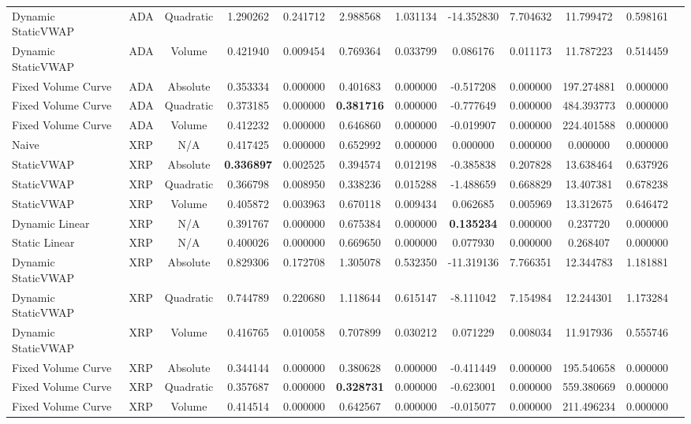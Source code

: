 \begin{table}[H]
{\begin{tabular}{llcccccccccc}
        Dynamic StaticVWAP & ADA & Quadratic & 1.290262 & 0.241712 & 2.988568 & 1.031134 & -14.352830 & 7.704632 & 11.799472 & 0.598161 \\
        Dynamic StaticVWAP & ADA & Volume & 0.421940 & 0.009454 & 0.769364 & 0.033799 & 0.086176 & 0.011173 & 11.787223 & 0.514459 \\
        Fixed Volume Curve & ADA & Absolute & 0.353334 & 0.000000 & 0.401683 & 0.000000 & -0.517208 & 0.000000 & 197.274881 & 0.000000 \\
        Fixed Volume Curve & ADA & Quadratic & 0.373185 & 0.000000 & \textbf{0.381716} & 0.000000 & -0.777649 & 0.000000 & 484.393773 & 0.000000 \\
        Fixed Volume Curve & ADA & Volume & 0.412232 & 0.000000 & 0.646860 & 0.000000 & -0.019907 & 0.000000 & 224.401588 & 0.000000 \\
        \hline
        Naive & XRP & N/A & 0.417425 & 0.000000 & 0.652992 & 0.000000 & 0.000000 & 0.000000 & 0.000000 & 0.000000 \\
        StaticVWAP & XRP & Absolute & \textbf{0.336897} & 0.002525 & 0.394574 & 0.012198 & -0.385838 & 0.207828 & 13.638464 & 0.637926 \\
        StaticVWAP & XRP & Quadratic & 0.366798 & 0.008950 & 0.338236 & 0.015288 & -1.488659 & 0.668829 & 13.407381 & 0.678238 \\
        StaticVWAP & XRP & Volume & 0.405872 & 0.003963 & 0.670118 & 0.009434 & 0.062685 & 0.005969 & 13.312675 & 0.646472 \\
        Dynamic Linear & XRP & N/A & 0.391767 & 0.000000 & 0.675384 & 0.000000 & \textbf{0.135234} & 0.000000 & 0.237720 & 0.000000 \\
        Static Linear & XRP & N/A & 0.400026 & 0.000000 & 0.669650 & 0.000000 & 0.077930 & 0.000000 & 0.268407 & 0.000000 \\
        Dynamic StaticVWAP & XRP & Absolute & 0.829306 & 0.172708 & 1.305078 & 0.532350 & -11.319136 & 7.766351 & 12.344783 & 1.181881 \\
        Dynamic StaticVWAP & XRP & Quadratic & 0.744789 & 0.220680 & 1.118644 & 0.615147 & -8.111042 & 7.154984 & 12.244301 & 1.173284 \\
        Dynamic StaticVWAP & XRP & Volume & 0.416765 & 0.010058 & 0.707899 & 0.030212 & 0.071229 & 0.008034 & 11.917936 & 0.555746 \\
        Fixed Volume Curve & XRP & Absolute & 0.344144 & 0.000000 & 0.380628 & 0.000000 & -0.411449 & 0.000000 & 195.540658 & 0.000000 \\
        Fixed Volume Curve & XRP & Quadratic & 0.357687 & 0.000000 & \textbf{0.328731} & 0.000000 & -0.623001 & 0.000000 & 559.380669 & 0.000000 \\
        Fixed Volume Curve & XRP & Volume & 0.414514 & 0.000000 & 0.642567 & 0.000000 & -0.015077 & 0.000000 & 211.496234 & 0.000000 \\
        \hline
        \end{tabular}
    }
    \label{tab:static_vwap_results_48}
\end{table}